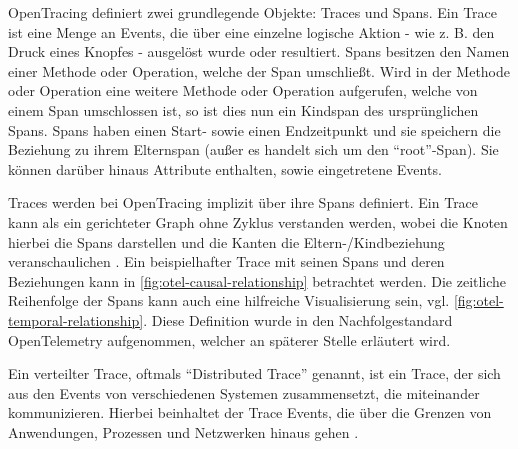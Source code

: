 OpenTracing definiert zwei grundlegende Objekte: Traces und Spans. Ein Trace ist eine Menge an Events, die über eine einzelne logische Aktion - wie z. B. den Druck eines Knopfes - ausgelöst wurde oder resultiert. Spans besitzen den Namen einer Methode oder Operation, welche der Span umschließt. Wird in der Methode oder Operation eine weitere Methode oder Operation aufgerufen, welche von einem Span umschlossen ist, so ist dies nun ein Kindspan des ursprünglichen Spans. Spans haben einen Start- sowie einen Endzeitpunkt und sie speichern die Beziehung zu ihrem Elternspan (außer es handelt sich um den \enquote{root}-Span). Sie können darüber hinaus Attribute enthalten, sowie eingetretene Events.

Traces werden bei OpenTracing implizit über ihre Spans definiert. Ein Trace kann als ein gerichteter Graph ohne Zyklus verstanden werden, wobei die Knoten hierbei die Spans darstellen und die Kanten die Eltern-/Kindbeziehung veranschaulichen \cite{OpenTracingSpecification}. Ein beispielhafter Trace mit seinen Spans und deren Beziehungen kann in \autoref{fig:otel-causal-relationship} betrachtet werden. Die zeitliche Reihenfolge der Spans kann auch eine hilfreiche Visualisierung sein, vgl. \autoref{fig:otel-temporal-relationship}. Diese Definition wurde in den Nachfolgestandard OpenTelemetry aufgenommen, welcher an späterer Stelle erläutert wird.

Ein verteilter Trace, oftmals \enquote{Distributed Trace} genannt, ist ein Trace, der sich aus den Events von verschiedenen Systemen zusammensetzt, die miteinander kommunizieren. Hierbei beinhaltet der Trace Events, die über die Grenzen von Anwendungen, Prozessen und Netzwerken hinaus gehen \cite{OpenTracingSpecification}.

